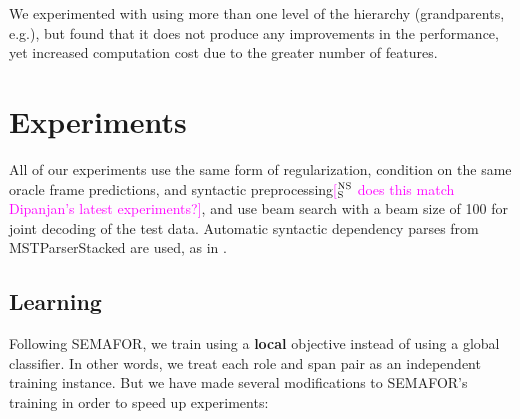 \documentclass[11pt,a4paper]{article}
\newcommand{\ensuretext}[1]{#1}
\newcommand{\nssmarker}{\ensuretext{\textcolor{magenta}{\ensuremath{^{\textsc{NS}}_{\textsc{S}}}}}}
\newcommand{\stmarker}{\ensuretext{\textcolor{blue}{\ensuremath{^{\textsc{S}}_{\textsc{T}}}}}}
\newcommand{\arkcomment}[3]{\ensuretext{\textcolor{#3}{[#1 #2]}}}
\newcommand{\nss}[1]{\arkcomment{\nssmarker}{#1}{magenta}}
\newcommand{\st}[1]{\arkcomment{\stmarker}{#1}{blue}}
\newcommand{\term}[1]{\textbf{#1}} %
\begin{document}
We experimented with using more than one level of the hierarchy (grandparents, e.g.), but found that it does not produce any improvements in the performance, yet increased computation cost due to the greater number of features.



\section{Experiments}

All of our experiments use the same form of regularization, 
condition on the same oracle frame predictions, 
and syntactic preprocessing\nss{does this match Dipanjan's latest experiments?}, 
and use beam search with a beam size of 100 for joint decoding of the test data.
Automatic syntactic dependency parses from MSTParserStacked \citep{martins-08} are used, as in \citet{das-14}. %


\subsection{Learning}
\label{sec:learning}

Following SEMAFOR, we train using a \term{local} objective instead of using a global classifier.
In other words, we treat each role and span pair as an independent training instance.
%
But we have made several modifications to SEMAFOR's training in order to speed up experiments:
\end{document}
